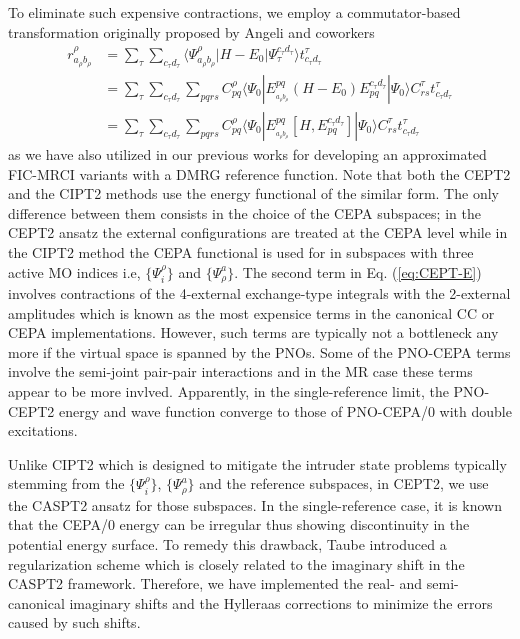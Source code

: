 \documentclass[aip,jcp,amsmath]{revtex4-1}
\begin{document}
%
To eliminate such expensive contractions, we employ a commutator-based transformation originally proposed by Angeli and coworkers\cite{angeliintroduction2001,angelin-electron2002,angelinew2006}
%
\begin{align}
  r_{a_\rho b_\rho}^{\rho} &= \sum_{\tau}\sum_{c_\tau d_\tau}\langle\Psi_{a_\rho b_\rho}^{\rho}|H-E_0|\Psi_{\tau}^{c_\tau d_\tau}\rangle t_{c_\tau d_\tau}^\tau \nonumber \\
  &= \sum_{\tau}\sum_{c_\tau d_\tau} \sum_{pqrs} C_{pq}^\rho \langle\Psi_0|E_{_{a_\rho b_\rho}}^{pq}(H-E_0)E_{pq}^{c_\tau d_\tau}|\Psi_0\rangle C_{rs}^\tau t_{c_\tau d_\tau}^\tau \nonumber \\
  &= \sum_{\tau}\sum_{c_\tau d_\tau} \sum_{pqrs} C_{pq}^\rho \langle\Psi_0|E_{_{a_\rho b_\rho}}^{pq}[H,E_{pq}^{c_\tau d_\tau}]|\Psi_0\rangle C_{rs}^\tau t_{c_\tau d_\tau}^\tau \label{eq:comm}
\end{align}
as we have also utilized in our previous works for developing an approximated FIC-MRCI variants with a DMRG reference function.\cite{saitowmultireference2013,doi:10.1021/acs.jctc.5b00270}
%
Note that both the CEPT2 and the CIPT2\cite{celanithe2004} methods use the energy functional of the similar form.
%
The only difference between them consists in the choice of the CEPA subspaces; in the CEPT2 ansatz the external configurations are treated at the CEPA level while in the CIPT2 method the CEPA functional is used for in subspaces with three active MO indices i.e, $\{\Psi_i^\rho\}$ and $\{\Psi_\rho^a\}$.
%
The second term in Eq. (\ref{eq:CEPT-E}) involves contractions of the 4-external exchange-type integrals with the 2-external amplitudes which is known as the most expensice terms in the canonical CC or CEPA implementations.
%
However, such terms are typically not a bottleneck any more if the virtual space is spanned by the PNOs.
%
Some of the PNO-CEPA terms involve the semi-joint pair-pair interactions and in the MR case these terms appear to be more invlved.
%
Apparently, in the single-reference limit, the PNO-CEPT2 energy and wave function converge to those of PNO-CEPA/0 with double excitations.

%
Unlike CIPT2 which is designed to mitigate the intruder state problems typically stemming from the $\{\Psi_i^\rho\}$, $\{\Psi_\rho^a\}$ and the reference subspaces, in CEPT2, we use the CASPT2 ansatz for those subspaces.
%
In the single-reference case, it is known that the CEPA/0 energy can be irregular thus showing discontinuity in the potential energy surface.
%
To remedy this drawback, Taube introduced a regularization scheme which is closely related to the imaginary shift in the CASPT2 framework.\cite{doi:10.1063/1.3115467}
%
Therefore, we have implemented the real- and semi-canonical imaginary shifts and the Hylleraas corrections to minimize the errors caused by such shifts.
\end{document}
